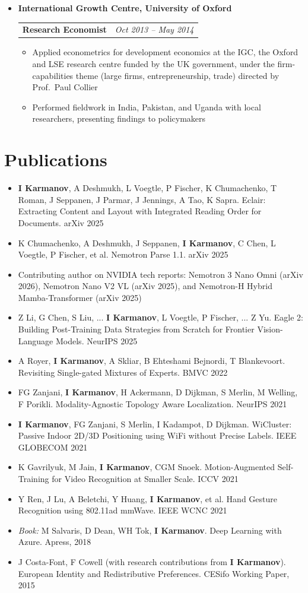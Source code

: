 \documentclass[letterpaper,11pt]{article}
\makeatletter
\newcommand{\cvcompany}[1]{
  \vspace{2pt}\item \textbf{#1} \\[1pt]
}
\newcommand{\cvrole}[2]{
    \begin{tabular*}{0.97\textwidth}[t]{l@{\extracolsep{\fill}}r}
      \textbf{#1} & \textit{\small #2} \\
    \end{tabular*}\vspace{-7pt}
}
\newcommand{\cvpub}[1]{\item\small{#1}\vspace{-2pt}}
\makeatother
\begin{document}
\begin{itemize}[leftmargin=0.15in, label={}]
    \cvcompany{International Growth Centre, University of Oxford}
      \cvrole{Research Economist}{Oct 2013 -- May 2014}
      \begin{itemize}
        \item Applied econometrics for development economics at the IGC, the Oxford and LSE research centre funded by the UK government, under the firm-capabilities theme (large firms, entrepreneurship, trade) directed by Prof.\ Paul Collier
        \item Performed fieldwork in India, Pakistan, and Uganda with local researchers, presenting findings to policymakers
      \end{itemize}

  \end{itemize}

\section{Publications}
  \begin{itemize}[leftmargin=0.15in, label={}]
    \cvpub{\textbf{I Karmanov}, A Deshmukh, L Voegtle, P Fischer, K Chumachenko, T Roman, J Seppanen, J Parmar, J Jennings, A Tao, K Sapra. Eclair: Extracting Content and Layout with Integrated Reading Order for Documents. arXiv 2025}
    \cvpub{K Chumachenko, A Deshmukh, J Seppanen, \textbf{I Karmanov}, C Chen, L Voegtle, P Fischer, et al. Nemotron Parse 1.1. arXiv 2025}
    \cvpub{Contributing author on NVIDIA tech reports: Nemotron 3 Nano Omni (arXiv 2026), Nemotron Nano V2 VL (arXiv 2025), and Nemotron-H Hybrid Mamba-Transformer (arXiv 2025)}
    \cvpub{Z Li, G Chen, S Liu, ... \textbf{I Karmanov}, L Voegtle, P Fischer, ... Z Yu. Eagle 2: Building Post-Training Data Strategies from Scratch for Frontier Vision-Language Models. NeurIPS 2025}
    \cvpub{A Royer, \textbf{I Karmanov}, A Skliar, B Ehteshami Bejnordi, T Blankevoort. Revisiting Single-gated Mixtures of Experts. BMVC 2022}
    \cvpub{FG Zanjani, \textbf{I Karmanov}, H Ackermann, D Dijkman, S Merlin, M Welling, F Porikli. Modality-Agnostic Topology Aware Localization. NeurIPS 2021}
    \cvpub{\textbf{I Karmanov}, FG Zanjani, S Merlin, I Kadampot, D Dijkman. WiCluster: Passive Indoor 2D/3D Positioning using WiFi without Precise Labels. IEEE GLOBECOM 2021}
    \cvpub{K Gavrilyuk, M Jain, \textbf{I Karmanov}, CGM Snoek. Motion-Augmented Self-Training for Video Recognition at Smaller Scale. ICCV 2021}
    \cvpub{Y Ren, J Lu, A Beletchi, Y Huang, \textbf{I Karmanov}, et al. Hand Gesture Recognition using 802.11ad mmWave. IEEE WCNC 2021}
    \cvpub{\textit{Book:} M Salvaris, D Dean, WH Tok, \textbf{I Karmanov}. Deep Learning with Azure. Apress, 2018}
    \cvpub{J Costa-Font, F Cowell (with research contributions from \textbf{I Karmanov}). European Identity and Redistributive Preferences. CESifo Working Paper, 2015}
  \end{itemize}
\end{document}
